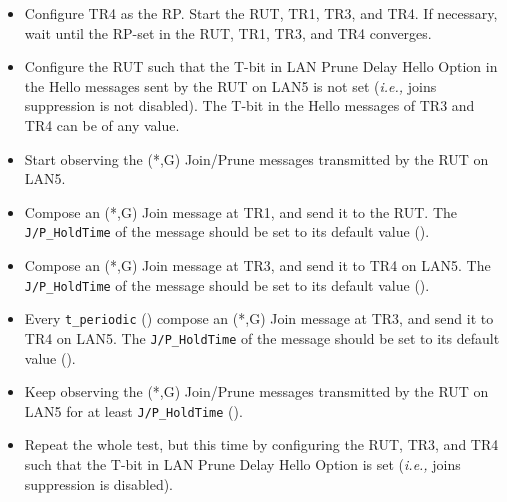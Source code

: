 \documentclass[11pt]{report}
\newcommand{\ie}{\emph{i.e.,}\xspace}
\begin{document}

\begin{itemize}

  \item Configure TR4 as the RP. Start the RUT, TR1, TR3, and TR4. If
  necessary, wait until the RP-set in the RUT, TR1, TR3, and TR4
  converges.

  \item Configure the RUT such that the T-bit in LAN Prune Delay Hello
  Option in the Hello messages sent by the RUT on LAN5 is not set (\ie joins
  suppression is not disabled). The T-bit in the Hello messages of TR3 and TR4
  can be of any value.

  \item Start observing the (*,G) Join/Prune messages transmitted by the
  RUT on LAN5.

  \item Compose an (*,G) Join message at TR1, and send it to the RUT. 
  The \verb=J/P_HoldTime= of the message should be set to its default
  value ({\PimsmJPHoldTime}).

  \item Compose an (*,G) Join message at TR3, and send it to TR4 on LAN5.
  The \verb=J/P_HoldTime= of the message should be set to its default
  value ({\PimsmJPHoldTime}).

  \item Every \verb=t_periodic= ({\PimsmTPeriodic}) compose an (*,G) Join
  message at TR3, and send it to TR4 on LAN5.
  The \verb=J/P_HoldTime= of the message should be set to its default
  value ({\PimsmJPHoldTime}).

  \item Keep observing the (*,G) Join/Prune messages transmitted by the
  RUT on LAN5 for at least \verb=J/P_HoldTime= ({\PimsmJPHoldTime}).

  \item Repeat the whole test, but this time by configuring the RUT, TR3, and
  TR4 such that the T-bit in LAN Prune Delay Hello Option is set (\ie joins
  suppression is disabled).

\end{itemize}

\end{document}
